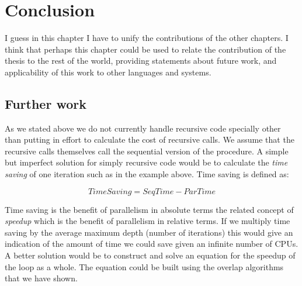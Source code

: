 
\chapter{Conclusion}
\label{chap:conc}


I guess in this chapter I have to unify the contributions of the other
chapters.
I think that perhaps this chapter could be used to relate the contribution
of the thesis to the rest of the world, providing statements about future
work, and applicability of this work to other languages and systems.


\section{Further work}
\label{sec:further_work}





As we stated above we do not currently handle recursive code specially other
than putting in effort to calculate the cost of recursive calls.
We assume that the recursive calls themselves call the sequential version of
the procedure.
A simple but imperfect solution for simply recursive code would be to
calculate the \emph{time saving} of one iteration such as in the example
above.
Time saving is defined as:

\begin{equation*}
TimeSaving = SeqTime - ParTime
\end{equation*}

\noindent
Time saving is the benefit of parallelism in absolute terms
the related concept of \emph{speedup} which is the benefit of parallelism in
relative terms.
If we multiply time saving by the average maximum depth (number of
iterations) this would give an indication of the amount of time we could
save given an infinite number of CPUs.
A better solution would be to construct and solve an equation for the
speedup of the loop as a whole.
The equation could be built using the overlap algorithms that we have shown.


